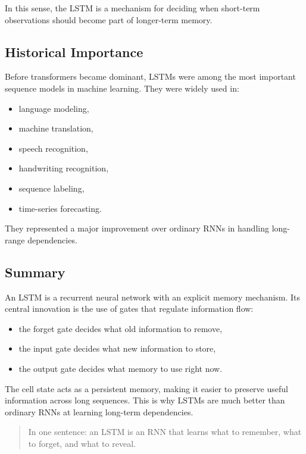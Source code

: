 In this sense, the LSTM is a mechanism for deciding when short-term observations should become part of longer-term memory.

\subsection{Historical Importance}

Before transformers became dominant, LSTMs were among the most important sequence models in machine learning. They were widely used in:
\begin{itemize}
    \item language modeling,
    \item machine translation,
    \item speech recognition,
    \item handwriting recognition,
    \item sequence labeling,
    \item time-series forecasting.
\end{itemize}

They represented a major improvement over ordinary RNNs in handling long-range dependencies.

\subsection{Summary}

An LSTM is a recurrent neural network with an explicit memory mechanism. Its central innovation is the use of gates that regulate information flow:
\begin{itemize}
    \item the forget gate decides what old information to remove,
    \item the input gate decides what new information to store,
    \item the output gate decides what memory to use right now.
\end{itemize}

The cell state acts as a persistent memory, making it easier to preserve useful information across long sequences. This is why LSTMs are much better than ordinary RNNs at learning long-term dependencies.

\begin{quote}
In one sentence: an LSTM is an RNN that learns what to remember, what to forget, and what to reveal.
\end{quote}